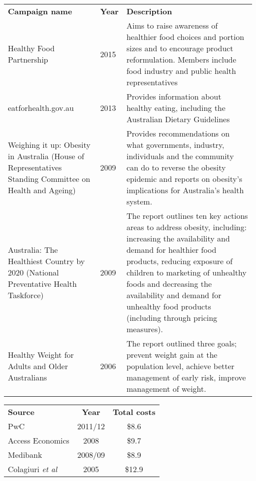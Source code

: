 \onecolumn
\bgroup
\def\arraystretch{1.5}
\begin{tabularx}{\textwidth}{ll*1{>{\arraybackslash}X}}
\toprule
\multicolumn{1}{p{7cm}}{\textbf{Campaign name}} & \textbf{Year} & \textbf{Description} \\ \cmidrule(lr){1-3}
\multicolumn{1}{p{7cm}}{Healthy Food Partnership} & 2015 & Aims to raise awareness of healthier food choices and portion sizes and to encourage product reformulation. Members include food industry and public health representatives \\
\multicolumn{1}{p{7cm}}{eatforhealth.gov.au} & 2013 & Provides information about healthy eating, including the Australian Dietary Guidelines \\
\multicolumn{1}{p{7cm}}{Weighing it up: Obesity in Australia (House of Representatives Standing Committee on Health and Ageing)} & 2009 & Provides recommendations on what governments, industry, individuals and the community can do to reverse the obesity epidemic and reports on obesity's implications for Australia's health system. \\ 
\multicolumn{1}{p{7cm}}{Australia: The Healthiest Country by 2020 (National Preventative Health Taskforce)} & 2009 & The report outlines ten key actions areas to address obesity, including: increasing the availability and demand for healthier food products, reducing exposure of children to marketing of unhealthy foods and decreasing the availability and demand for unhealthy food products (including through pricing measures). \\
\multicolumn{1}{p{7cm}}{Healthy Weight for Adults and Older Australians} & 2006 & The report outlined three goals; prevent weight gain at the population level, achieve better management of early risk, improve management of weight. \\
\bottomrule
\end{tabularx}
\egroup
\twocolumn

\bgroup
\def\arraystretch{1.2}
\begin{tabular}{lcc}
\toprule
\textbf{Source} & \textbf{Year} & \textbf{Total costs} \\ \cmidrule(lr){1-3}
PwC & 2011/12 & \$8.6 \\
Access Economics & 2008 & \$9.7 \\
Medibank & 2008/09 & \$8.9 \\
Colagiuri \emph{et al } & 2005 & \$12.9 \\
\bottomrule
\end{tabular}
\egroup

